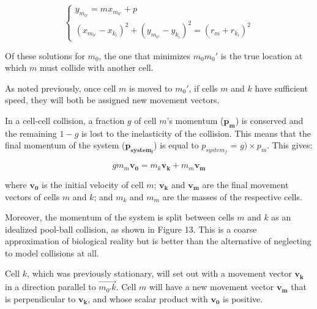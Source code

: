 \documentclass[12pt]{article}
\begin{document}
\begin{equation}
  \begin{cases} 
    y_{m_{0'}} = mx_{m_{0'}} + p \\
    (x_{m_{0'}} - x_{k_i})^2 + (y_{m_{0'}}-y_{k_i})^2 =  (r_m+r_{k_i})^2
  \end{cases}
\end{equation}

Of these solutions for \(m_0\), the one that minimizes \(m_0m_0'\) 
is the true location at which \(m\) must collide with another 
cell. 

As noted previously, once cell \(m\) is moved to \(m_0'\), if 
cells \(m\) and \(k\) have sufficient speed, they will both be assigned new movement vectors.

In a cell-cell collision, a fraction \(g\) of cell \(m\)'s momentum (\(\mathbf{p_m}\)) is conserved and the 
remaining \(1-g\) is lost to the inelasticity of the collision. This means that the final momentum 
of the system (\(\mathbf{p_{system_f}}\)) is equal to \(p_{system_f}\) = \(g) \times p_m\). 
This gives:

\begin{equation}
  gm_m\mathbf{v_0} = m_k\mathbf{v_k}+m_m\mathbf{v_m}
\end{equation}

where \(\mathbf{v_0}\) is the initial velocity of cell \(m\);
\(\mathbf{v_k}\) and \(\mathbf{v_m}\) are the final movement vectors of cells \(m\) and \(k\); and \(m_k\) and
\(m_m\) are the masses of the respective cells.

Moreover, the momentum of the system is split between cells \(m\) and \(k\) as an idealized 
pool-ball collision, as shown in Figure 13. This is a coarse approximation of biological 
reality but is better than the alternative of neglecting to model collisions at all. 

Cell \(k\), which was previously stationary, will 
set out with a movement vector \(\mathbf{v_k}\) in a direction parallel to \(\overrightarrow{m_{0'}k}\).
Cell \(m\) will have a new movement vector \(\mathbf{v_m}\) 
that is perpendicular to \(\mathbf{v_k}\), and whose scalar product with \(\mathbf{v_0}\) 
is positive.
\end{document}
